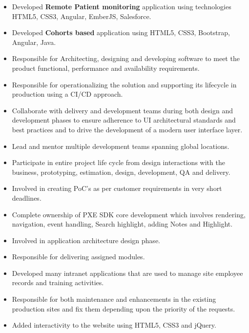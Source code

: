 \documentclass[11pt,a4paper,ragged2e]{altacv}
\begin{document}
\begin{itemize}
\item Developed \textbf{Remote Patient monitoring} application using technologies
HTML5, CSS3, Angular, EmberJS, Salesforce. 
\item Developed \textbf{Cohorts based}  application  using HTML5, CSS3,
Bootstrap, Angular, Java. 
\item  Responsible for Architecting, designing and developing software to meet the
product functional, performance and availability requirements. 
\item Responsible for operationalizing the solution and supporting its lifecycle in
production using a CI/CD approach.
\item Collaborate with delivery and development teams during both design and
development phases to ensure adherence to UI architectural standards and best
practices and to drive the development of a modern user interface layer.
\item Lead and mentor multiple development teams spanning global locations.
\item Participate in entire project life cycle from design interactions with the business,
prototyping, estimation, design, development, QA and delivery.
\item Involved in creating PoC's as per customer requirements in very short deadlines.
\end{itemize}
\smallskip
\divider

\begin{itemize}
\item Complete ownership of PXE SDK core development which involves rendering,
navigation, event handling, Search highlight, adding Notes and Highlight.
\item Involved in application architecture design phase.
\item Responsible for delivering assigned modules.
\end{itemize}
\smallskip
\divider


\begin{itemize}
\item Developed many intranet applications that are used to manage site employee
records and training activities.
\item Responsible for both maintenance and enhancements in the existing production
sites and fix them depending upon the priority of the requests.
\item Added interactivity to the website using HTML5, CSS3 and jQuery.
\smallskip
\end{itemize}
\end{document}
